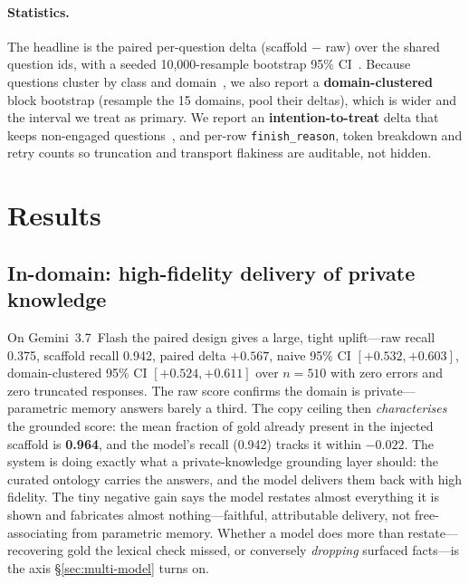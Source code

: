 \documentclass[11pt]{article}
\begin{document}
\paragraph{Statistics.}
The headline is the paired per-question delta (scaffold $-$ raw) over the shared question ids,
with a seeded 10{,}000-resample bootstrap 95\% CI~\cite{efron1979bootstrap,koehn2004significance}.
Because questions cluster by class and domain~\cite{dror2018hitchhiker}, we also report a
\textbf{domain-clustered} block bootstrap (resample the 15 domains, pool their deltas), which is
wider and the interval we treat as primary. We report an \textbf{intention-to-treat} delta that
keeps non-engaged questions~\cite{hollis1999itt}, and per-row \texttt{finish\_reason}, token
breakdown and retry counts so truncation and transport flakiness are auditable, not hidden.

\section{Results}\label{sec:results}

\subsection{In-domain: high-fidelity delivery of private knowledge}
On Gemini~3.7~Flash the paired design gives a large, tight uplift---raw recall 0.375,
scaffold recall 0.942, paired delta $\mathbf{+0.567}$, naive 95\% CI $[+0.532,+0.603]$,
domain-clustered 95\% CI $[+0.524,+0.611]$ over $n=510$ with zero errors and zero truncated
responses. The raw score confirms the domain is private---parametric memory answers barely a
third. The copy ceiling then \emph{characterises} the grounded score: the mean fraction of gold
already present in the injected scaffold is \textbf{0.964}, and the model's recall (0.942) tracks
it within $-0.022$. The system is doing exactly what a private-knowledge grounding layer should:
the curated ontology carries the answers, and the model delivers them back with high fidelity. The
tiny negative gain says the model restates almost everything it is shown and fabricates almost
nothing---faithful, attributable delivery, not free-associating from parametric memory. Whether a
model does more than restate---recovering gold the lexical check missed, or conversely
\emph{dropping} surfaced facts---is the axis \S\ref{sec:multi-model} turns on.
\end{document}

